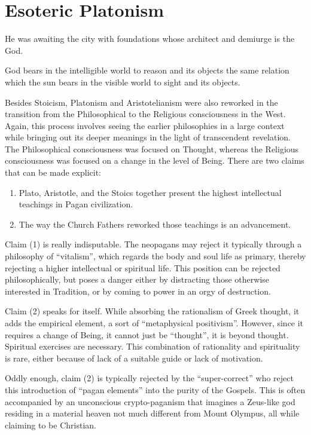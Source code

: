 \section{Esoteric Platonism}

\begin{quotex}
He was awaiting the city with foundations whose architect and demiurge is the God. 

God bears in the intelligible world to reason and its objects the same relation which the sun bears in the visible world to sight and its objects.  

\end{quotex}
Besides Stoicism, Platonism and Aristotelianism were also reworked in the transition from the Philosophical to the Religious consciousness in the West. Again, this process involves seeing the earlier philosophies in a large context while bringing out its deeper meanings in the light of transcendent revelation. The Philosophical consciousness was focused on Thought, whereas the Religious consciousness was focused on a change in the level of Being. There are two claims that can be made explicit:

\begin{enumerate}
\item Plato, Aristotle, and the Stoics together present the highest intellectual teachings in Pagan civilization. 
\item The way the Church Fathers reworked those teachings is an advancement. 
\end{enumerate}

Claim (1) is really indisputable. The neopagans may reject it typically through a philosophy of “vitalism”, which regards the body and soul life as primary, thereby rejecting a higher intellectual or spiritual life. This position can be rejected philosophically, but poses a danger either by distracting those otherwise interested in Tradition, or by coming to power in an orgy of destruction.

Claim (2) speaks for itself. While absorbing the rationalism of Greek thought, it adds the empirical element, a sort of “metaphysical positivism”. However, since it requires a change of Being, it cannot just be “thought”, it is beyond thought. Spiritual exercises are necessary. This combination of rationality and spirituality is rare, either because of lack of a suitable guide or lack of motivation.

Oddly enough, claim (2) is typically rejected by the “super-correct” who reject this introduction of “pagan elements” into the purity of the Gospels. This is often accompanied by an unconscious crypto-paganism that imagines a Zeus-like god residing in a material heaven not much different from Mount Olympus, all while claiming to be Christian.


